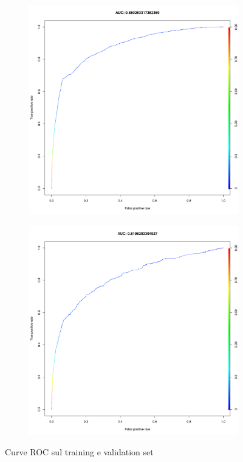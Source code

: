 \begin{figure}[H]
	\centering
	\begin{subfigure}[t]{1\textwidth}
		\begin{minipage}[t]{0.475\textwidth}
			\includegraphics[width=\textwidth]{images/ml/svm/HoldoutSVM/auc_train}
			\label{fig:svm_h_roc_train} 
		\end{minipage}
		\hfill
		\begin{minipage}[t]{0.475\textwidth}
			\includegraphics[width=\textwidth]{images/ml/svm/HoldoutSVM/auc_test}
			\label{fig:svm_h_roc_test} 
		\end{minipage}
	\end{subfigure}
	\caption{Curve ROC sul training e validation set}
	\label{fig:svm_h_roc}
\end{figure}


